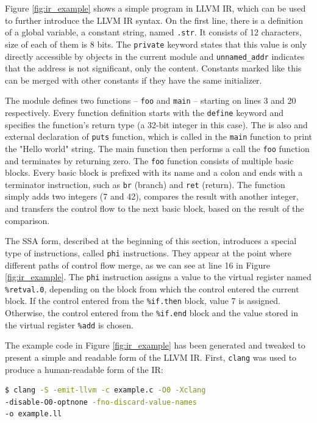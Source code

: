 \documentclass[
  digital, %
  notable,   %
  twoside, %
  nolof,     %
  nolot,     %
]{fithesis3}
\theoremstyle{definition}
\begin{document}
Figure \ref{fig:ir_example} shows a simple program in LLVM IR, which can be used to further introduce the LLVM IR syntax. On the first line, there is a definition of a global variable, a constant string, named \texttt{.str}. It consists of 12 characters, size of each of them is 8 bits. The \texttt{private} keyword states that this value is only directly accessible by objects in the current module and \texttt{unnamed\_addr} indicates that the address is not significant, only the content. Constants marked like this can be merged with other constants if they have the same initializer. 


The module defines two functions -- \texttt{foo} and \texttt{main} -- starting on lines 3 and 20 respectively. Every function definition starts with the \texttt{define} keyword and specifies the function's return type (a 32-bit integer in this case). The is also and external declaration of \texttt{puts} function, which is called in the \texttt{main} function to print the "Hello world" string. The main function then performs a call the \texttt{foo} function and terminates by returning zero. The \texttt{foo} function consists of multiple basic blocks. Every basic block is prefixed with its name and a colon and ends with a terminator instruction, such as \texttt{br} (branch) and \texttt{ret} (return). The function simply adds two integers (7 and 42), compares the result with another integer, and transfers the control flow to the next basic block, based on the result of the comparison. 

The SSA form, described at the beginning of this section, introduces a special type of instructions, called \texttt{phi} instructions. They appear at the point where different paths of control flow merge, as we can see at line 16 in Figure \ref{fig:ir_example}. The \texttt{phi} instruction assigns a value to the virtual register named \texttt{\%retval.0}, depending on the block from which the control entered the current block. If the control entered from the \texttt{\%if.then} block, value 7 is assigned. Otherwise, the control entered from the \texttt{\%if.end} block and the value stored in the virtual register \texttt{\%add} is chosen. 

The example code in Figure \ref{fig:ir_example} has been generated and tweaked to present a simple and readable form of the LLVM IR. First, \texttt{clang} was used to produce a human-readable form of the IR:

\begin{lstlisting}[language=bash]
$ clang -S -emit-llvm -c example.c -O0 -Xclang  
-disable-O0-optnone -fno-discard-value-names 
-o example.ll
\end{lstlisting}
\end{document}
